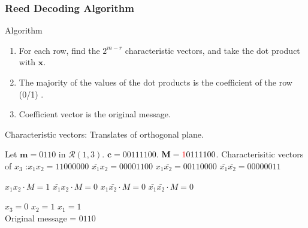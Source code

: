 \documentclass[xcolor=xvgnames]{beamer}
\newcommand{\RM}[2]{\ensuremath{\mathcal{R}(#1,#2)}}
\newcommand{\V}[1]{\ensuremath{\mathbf{#1}}}
\begin{document}


\begin{frame}
  \frametitle{Reed Decoding Algorithm}
  \begin{block}{Algorithm}
    \begin{enumerate}
    \item For each row, find the $2^{m-r}$ \alert{characteristic vectors}, and take the dot product with $\V{x}$. 
    \item The majority of the values of the dot products is the coefficient of the row (0/1) .
      \item Coefficient vector is the original message.
    \end{enumerate}
Characteristic vectors: Translates of orthogonal plane.
  \end{block}

  \begin{example}
Let $\V{m} = 0110$ in $\RM{1}{3}$. $\V{c} = 00111100$. $\V{M} = \textcolor{red}{1}0111100$.
Characterisitic vectors of $x_3$ :$x_1x_2 = 11000000 $
$\bar{x_1}x_2 = 00001100 $  
$x_1\bar{x_2} = 00110000 $ 
$\bar{x_1}\bar{x_2} = 00000011 $

$x_1x_2 \cdot M = 1$
$\bar{x_1}x_2 \cdot M = 0$
$x_1\bar{x_2} \cdot M = 0 $
$\bar{x_1}\bar{x_2} \cdot M = 0 $

$x_3 = 0$
$x_2 = 1$
$x_1 = 1$ \\

Original message = $0110$

  \end{example}
\end{frame}

\end{document}
